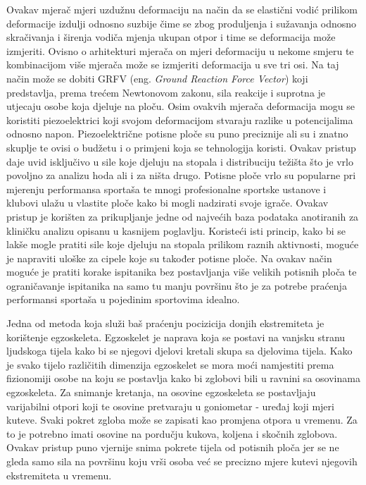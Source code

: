 \documentclass[times, utf8, diplomski]{fer}
\begin{document}
Ovakav mjerač mjeri uzdužnu deformaciju na način da se elastični vodić prilikom deformacije izdulji odnosno suzbije
čime se zbog produljenja i sužavanja odnosno skračivanja i širenja vodiča mjenja ukupan otpor i time se deformacija može izmjeriti.
Ovisno o arhitekturi mjerača on mjeri deformaciju u nekome smjeru te kombinacijom više mjerača može se izmjeriti deformacija
u sve tri osi. Na taj način može se dobiti GRFV (eng. \textit{Ground Reaction Force Vector}) koji predstavlja, prema trećem Newtonovom zakonu,
sila reakcije i suprotna je utjecaju osobe koja djeluje na ploču. Osim ovakvih mjerača deformacija mogu se koristiti piezoelektrici
koji svojom deformacijom stvaraju razlike u potencijalima odnosno napon. Piezoelektrične potisne ploče su puno preciznije ali su
i znatno skuplje te ovisi o budžetu i o primjeni koja se tehnologija koristi. Ovakav pristup daje uvid isključivo u sile koje
djeluju na stopala i distribuciju težišta što je vrlo povoljno za analizu hoda ali i za ništa drugo. Potisne ploče vrlo su popularne
pri mjerenju performansa sportaša te mnogi profesionalne sportske ustanove i klubovi ulažu u vlastite ploče kako bi mogli nadzirati
svoje igrače. Ovakav pristup je korišten za prikupljanje jedne od najvećih baza podataka anotiranih za kliničku analizu \citep{pressurePlate}
opisanu u kasnijem poglavlju. Koristeći isti princip, kako bi se lakše mogle pratiti sile koje djeluju na stopala prilikom
raznih aktivnosti, moguće je napraviti uloške za cipele koje su također potisne ploče. Na ovakav način moguće je pratiti korake
ispitanika bez postavljanja više velikih potisnih ploča te ograničavanje ispitanika na samo tu manju površinu što je za potrebe
praćenja performansi sportaša u pojedinim sportovima idealno.

Jedna od metoda koja služi baš praćenju pocizicija donjih ekstremiteta je korištenje egzoskeleta. Egzoskelet je naprava koja se
postavi na vanjsku stranu ljudskoga tijela kako bi se njegovi djelovi kretali skupa sa djelovima tijela. Kako je svako tijelo
različitih dimenzija egzoskelet se mora moći namjestiti prema fizionomiji osobe na koju se postavlja kako bi zglobovi bili u
ravnini sa osovinama egzoskeleta. Za snimanje kretanja, na osovine egzoskeleta se postavljaju varijabilni otpori koji te osovine
pretvaraju u goniometar - uređaj koji mjeri kuteve. Svaki pokret zgloba može se zapisati kao promjena otpora u vremenu. Za to je
potrebno imati osovine na pordučju kukova, koljena i skočnih zglobova. Ovakav pristup puno vjernije snima pokrete tijela od potisnih
ploča jer se ne gleda samo sila na površinu koju vrši osoba već se precizno mjere kutevi njegovih ekstremiteta u vremenu. 
\end{document}
